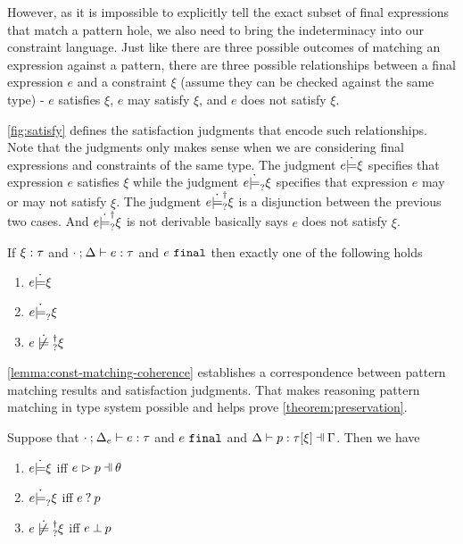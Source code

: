 However, as it is impossible to explicitly tell the exact subset of final expressions that match a pattern hole, we also need to bring the indeterminacy into our constraint language. 
Just like there are three possible outcomes of matching an expression against a pattern, there are three possible relationships between a final expression $e$ and a constraint $\xi$ (assume they can be checked against the same type) - $e$ satisfies $\xi$, $e$ may satisfy $\xi$, and $e$ does not satisfy $\xi$. 

\autoref{fig:satisfy} defines the satisfaction judgments that encode such relationships.
Note that the judgments only makes sense when we are considering 
final expressions and constraints of the same type. 
The
judgment $e \dot{\models} \xi$ specifies that expression $e$ satisfies $\xi$ while
the judgment $e \dot{\models}_{?} \xi$ specifies that expression $e$ may or may not
satisfy $\xi$. The judgment $e \dot{\models}_{?}^{\dag} \xi$ is a disjunction between the
previous two cases. 
And $e \dot{\models}_{?}^{\dag} \xi$ is not derivable basically says $e$ does not satisfy $\xi$.





\begin{theorem}
  \label{theorem:exclusive-constraint-satisfaction}
  If $\xi : \tau$ and $\cdot \mathbin{;} \Delta \vdash e : \tau$ and $e ~\mathtt{final}$ then exactly one of the following holds
  \begin{enumerate}
  \item $e \dot{\models} \xi$
  \item $e \dot{\models}_{?} \xi$
  \item $\cnotsatisfyormay{e}{\xi}$
  \end{enumerate}
\end{theorem}

\autoref{lemma:const-matching-coherence} establishes a correspondence
between pattern matching results and satisfaction judgments. That makes
reasoning pattern matching in type system possible and helps prove
\autoref{theorem:preservation}.

\begin{lemma}
  \label{lemma:const-matching-coherence}
  Suppose that $\cdot \mathbin{;} \Delta_e \vdash e : \tau$ and $e ~\mathtt{final}$ and $\chpattyp{p}{\tau}{\xi}{\Gamma}{\Delta}$. Then we have
  \begin{enumerate}
  \item $e \dot{\models} \xi$ iff $\hpatmatch{e}{p}{\theta}$
  \item $e \dot{\models}_{?} \xi$ iff $e \mathbin{?} p$
  \item $\cnotsatisfyormay{e}{\xi}$ iff $e \mathbin{\bot} p$
  \end{enumerate}
\end{lemma}


